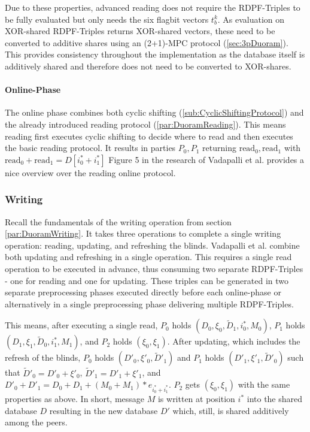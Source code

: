 Due to these properties, advanced reading does not require the RDPF-Triples to be fully evaluated but only needs the six flagbit vectors $t_b^k$. 
As evaluation on XOR-shared RDPF-Triples returns XOR-shared vectors, these need to be converted to additive shares using an (2+1)-MPC protocol (\ref{sec:3pDuoram}).
This provides consistency throughout the implementation as the database itself is additively shared and therefore does not need to be converted to XOR-shares.

\paragraph{Online-Phase}\label{par:advancedReadingOnline}
The online phase combines both cyclic shifting (\ref{sub:CyclicShiftingProtocol}) and the already introduced reading protocol (\ref{par:DuoramReading}).
This means reading first executes cyclic shifting to decide where to read and then executes the basic reading protocol. 
It results in parties $P_0,P_1$ returning $\text{read}_0,\text{read}_1$ with $\text{read}_0+\text{read}_1=D[i^*_0+i^*_1]$
Figure 5 in the research of Vadapalli et al. \cite{vadapalli2023duoram} provides a nice overview over the reading online protocol.

\subsubsection*{Writing}\label{subsub:advancedWriting}
Recall the fundamentals of the writing operation from section \ref{par:DuoramWriting}.
It takes three operations to complete a single writing operation: reading, updating, and refreshing the blinds.
Vadapalli et al. combine both updating and refreshing in a single  operation.
This requires a single read operation to be executed in advance, thus consuming two separate RDPF-Triples - one for reading and one for updating.
These triples can be generated in two separate preprocessing phases executed directly before each online-phase or alternatively in a single preprocessing phase delivering multiple RDPF-Triples.

This means, after executing a single read, $P_0$ holds $(D_0,\xi_0,\widetilde{D}_1,i_0^*,M_0)$, $P_1$ holds $(D_1,\xi_1,\widetilde{D}_0,i^*_1,M_1)$, and $P_2$ holds $(\xi_0,\xi_1)$.
After updating, which includes the refresh of the blinds, $P_0$ holds $(D'_0,\xi'_0,\widetilde{D}'_1)$ and $P_1$ holds $(D'_1,\xi'_1,\widetilde{D}'_0)$ such that $\widetilde{D}'_0=D'_0+\xi'_0$, $\widetilde{D}'_1=D'_1+\xi'_1$, and $D'_0+D'_1=D_0+D_1+(M_0+M_1)*e_{i^*_0+i^*_1}$.
$P_2$ gets $(\xi_0,\xi_1)$ with the same properties as above.
In short, message $M$ is written at position $i^*$ into the shared database $D$ resulting in the new database $D'$ which, still, is shared additively among the peers.


